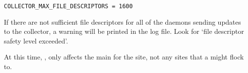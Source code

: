 \begin{verbatim}
COLLECTOR_MAX_FILE_DESCRIPTORS = 1600
\end{verbatim}

If there are not sufficient file descriptors for all of the daemons
sending updates to the collector, a warning will be printed in the
 log file.  Look for `file descriptor safety level exceeded'.

\Note At this time, , only
affects the main  for the site, not any sites that
a  might flock to.

